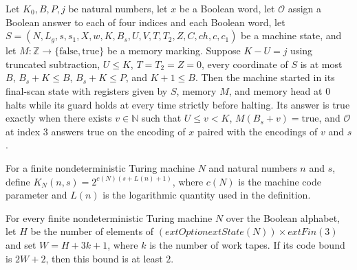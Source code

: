 \begin{theorem}
\label{Complexity.LogProg.ExpBFS.fscan_run}
\leanok
{}
Let $K_0,B,P,j$ be natural numbers, let $x$ be a Boolean word, let $\mathcal O$ assign a
Boolean answer to each of four indices and each Boolean word, let
$S=(N,L_g,s,s_1,X,w,K,B_s,U,V,T,T_2,Z,C,ch,c,c_1)$ be a machine state, and let
$M:\mathbb Z\to\{\mathrm{false},\mathrm{true}\}$ be a memory marking. Suppose $K-U=j$
using truncated subtraction, $U\le K$, $T=T_2=Z=0$, every coordinate of $S$ is at most
$B$, $B_s+K\le B$, $B_s+K\le P$, and $K+1\le B$. Then the machine started in its
final-scan state with registers given by $S$, memory $M$, and memory head at $0$ halts
while its guard holds at every time strictly before halting. Its answer is true exactly
when there exists $v\in\mathbb N$ such that $U\le v<K$, $M(B_s+v)=\mathrm{true}$, and
$\mathcal O$ at index $3$ answers true on the encoding of $x$ paired with the encodings
of $v$ and $s$.
\end{theorem}

\begin{definition}
\label{Complexity.LogProg.ExpBFS.kb}
\leanok
{}
For a finite nondeterministic Turing machine $N$ and natural numbers $n$ and $s$, define
$K_N(n,s)=2^{c(N)(s+L(n)+1)}$, where $c(N)$ is the machine code parameter and $L(n)$ is
the logarithmic quantity used in the definition.
\end{definition}

\begin{lemma}
\label{Complexity.LogProg.ExpBFS.two_le_codeK}
\leanok
{}
For every finite nondeterministic Turing machine $N$ over the Boolean alphabet, let $H$
be the number of elements of $(	ext{Option } 	ext{State}(N))\times	ext{Fin}(3)$ and set
$W=H+3k+1$, where $k$ is the number of work tapes. If its code bound is $2W+2$, then
this bound is at least $2$.
\end{lemma}

